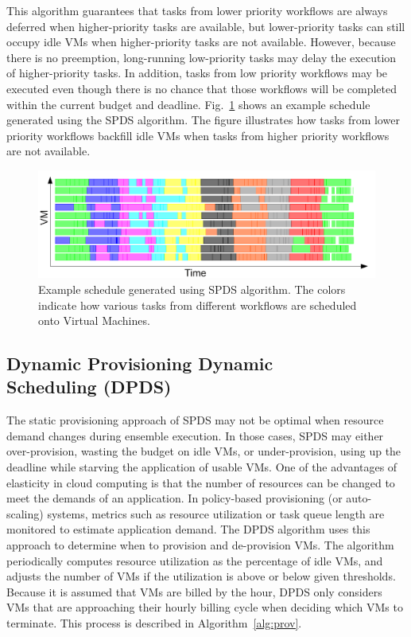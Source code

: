 \documentclass{sig-alternate}
\begin{document}
This algorithm guarantees that tasks from lower priority workflows are
always deferred when higher-priority tasks are available, but lower-priority
tasks can still occupy idle VMs when higher-priority tasks are not available. 
However, because there is no preemption, long-running low-priority tasks may delay 
the execution of higher-priority tasks. In addition, tasks from low priority 
workflows may be executed even though there is no chance that those workflows 
will be completed within the current budget and deadline. Fig.~\ref{fig:spds-example} 
shows an example schedule generated using the SPDS algorithm. The figure illustrates 
how tasks from lower priority workflows backfill idle VMs when tasks from higher 
priority workflows are not available.

\begin{figure}[htb] 
\centering
\includegraphics[width=1.0\columnwidth]{figures/spds-gantt}
 \caption{Example schedule generated using SPDS algorithm. The colors indicate how various tasks from different workflows are scheduled onto Virtual Machines. }
\label{fig:spds-example}
\end{figure}

\subsection{Dynamic Provisioning Dynamic \\Scheduling (DPDS)}
 
The static provisioning approach of SPDS may not be optimal when resource demand
changes during ensemble execution. In those cases, SPDS may either over-provision, 
wasting the budget on idle VMs, or under-provision, using up the deadline while starving 
the application of usable VMs. One of the advantages of elasticity in cloud computing 
is that the number of resources can be changed to meet the demands of an application.
In policy-based provisioning (or auto-scaling) systems, metrics such as resource 
utilization or task queue length are monitored to estimate application demand.
The DPDS algorithm uses this approach to determine when to provision and de-provision VMs. The 
algorithm periodically computes resource utilization as the percentage of idle VMs, and
adjusts the number of VMs if the utilization is above or below given thresholds.
Because it is assumed that VMs are billed by the hour, DPDS only considers VMs that are
approaching their hourly billing cycle when deciding which VMs to terminate. This process
is described in Algorithm~\ref{alg:prov}.
\end{document}
